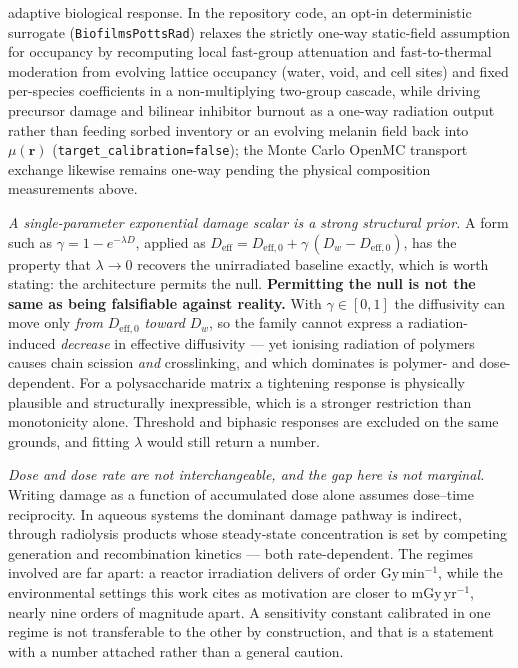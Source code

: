 \documentclass[11pt]{article}
\begin{document}
adaptive biological response. In the repository code, an opt-in deterministic surrogate (\texttt{BiofilmsPottsRad}) relaxes the strictly one-way static-field assumption for occupancy by recomputing local fast-group attenuation and fast-to-thermal moderation from evolving lattice occupancy (water, void, and cell sites) and fixed per-species coefficients in a non-multiplying two-group cascade, while driving precursor damage and bilinear inhibitor burnout as a one-way radiation output rather than feeding sorbed inventory or an evolving melanin field back into $\mu(\mathbf{r})$ (\texttt{target\_calibration=false}); the Monte Carlo OpenMC transport exchange likewise remains one-way pending the physical composition measurements above.

\emph{A single-parameter exponential damage scalar is a strong structural prior.} A form such as
$\gamma = 1 - e^{-\lambda D}$, applied as
$D_{\mathrm{eff}} = D_{\mathrm{eff},0} + \gamma\,(D_w - D_{\mathrm{eff},0})$, has the property
that $\lambda \to 0$ recovers the unirradiated baseline exactly, which is worth stating: the
architecture permits the null. \textbf{Permitting the null is not the same as being falsifiable
against reality.} With $\gamma \in [0,1]$ the diffusivity can move only \emph{from}
$D_{\mathrm{eff},0}$ \emph{toward} $D_w$, so the family cannot express a radiation-induced
\emph{decrease} in effective diffusivity --- yet ionising radiation of polymers causes chain
scission \emph{and} crosslinking, and which dominates is polymer- and dose-dependent. For a
polysaccharide matrix a tightening response is physically plausible and structurally
inexpressible, which is a stronger restriction than monotonicity alone. Threshold and biphasic
responses are excluded on the same grounds, and fitting $\lambda$ would still return a number.

\emph{Dose and dose rate are not interchangeable, and the gap here is not marginal.} Writing
damage as a function of accumulated dose alone assumes dose--time reciprocity. In aqueous systems
the dominant damage pathway is indirect, through radiolysis products whose steady-state
concentration is set by competing generation and recombination kinetics --- both rate-dependent.
The regimes involved are far apart: a reactor irradiation delivers of order
$\mathrm{Gy}\,\mathrm{min}^{-1}$, while the environmental settings this work cites as motivation
are closer to $\mathrm{mGy}\,\mathrm{yr}^{-1}$, nearly nine orders of magnitude apart. A
sensitivity constant calibrated in one regime is not transferable to the other by construction,
and that is a statement with a number attached rather than a general caution.
\end{document}
